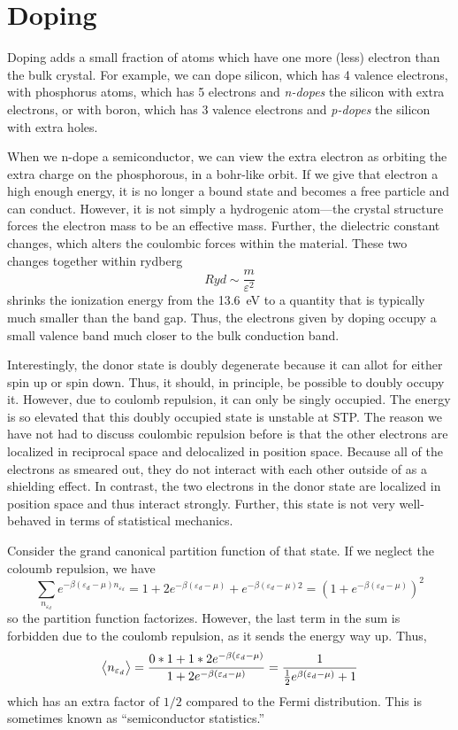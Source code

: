 \section{Doping}
Doping adds a small fraction of atoms which have one more (less) electron than the bulk crystal. For example, we can dope silicon, which has 4 valence electrons, with phosphorus atoms, which has 5 electrons and \emph{n-dopes} the silicon with extra electrons, or with boron, which has 3 valence electrons and \emph{p-dopes} the silicon with extra holes.

When we n-dope a semiconductor, we can view the extra electron as orbiting the extra charge on the phosphorous, in a bohr-like orbit. If we give that electron a high enough energy, it is no longer a bound state and becomes a free particle and can conduct. However, it is not simply a hydrogenic atom---the crystal structure forces the electron mass to be an effective mass. Further, the dielectric constant changes, which alters the coulombic forces within the material. These two changes together within rydberg
\[\si{Ryd}\sim \frac{m}{\varepsilon^2}\]
shrinks the ionization energy from the \SI{13.6}{eV} to a quantity that is typically much smaller than the band gap. Thus, the electrons given by doping occupy a small valence band much closer to the bulk conduction band.

Interestingly, the donor state is doubly degenerate because it can allot for either spin up or spin down. Thus, it should, in principle, be possible to doubly occupy it. However, due to coulomb repulsion, it can only be singly occupied. The energy is so elevated that this doubly occupied state is unstable at STP\@. The reason we have not had to discuss coulombic repulsion before is that the other electrons are localized in reciprocal space and delocalized in position space. Because all of the electrons as smeared out, they do not interact with each other outside of as a shielding effect. In contrast, the two electrons in the donor state are localized in position space and thus interact strongly. Further, this state is not very well-behaved in terms of statistical mechanics.

Consider the grand canonical partition function of that state. If we neglect the coloumb repulsion, we have 
\[\sum_{n_{\varepsilon_d}} e^{-\beta(\varepsilon_d-\mu)n_{\varepsilon_d}} = 1 + 2e^{-\beta (\varepsilon_d-\mu)}+e^{-\beta(\varepsilon_d-\mu)2} = (1+e^{-\beta(\varepsilon_d-\mu)})^2\]
so the partition function factorizes. However, the last term in the sum is forbidden due to the coulomb repulsion, as it sends the energy way up. Thus,
\[\left\langle \begin{matrix}n_{\varepsilon_d}\end{matrix} \right\rangle = \frac{0*1+1*2e^{-\beta(\varepsilon_d-\mu)}}{1+2e^{-\beta(\varepsilon_d-\mu)}} = \frac{1}{\frac{1}{2}e^{\beta(\varepsilon_d-\mu)}+1}\]
which has an extra factor of \(1/2\) compared to the Fermi distribution. This is sometimes known as ``semiconductor statistics.''

